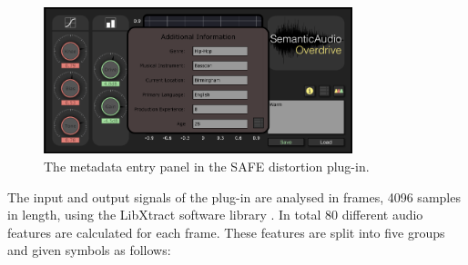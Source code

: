 		\begin{figure}[h!]
			\centering
			\includegraphics[width=0.8\textwidth]{chapter4/Images/SAFEMetadata.png}
			\caption{The metadata entry panel in the SAFE distortion plug-in.}
			\label{fig:SAFE-Metadata}
		\end{figure}

		The input and output signals of the plug-in are analysed in frames, 4096 samples in length, using the
		LibXtract software library \citep{bullock2007libxtract}. In total 80 different audio features are
		calculated for each frame. These features are split into five groups and given symbols as follows:


